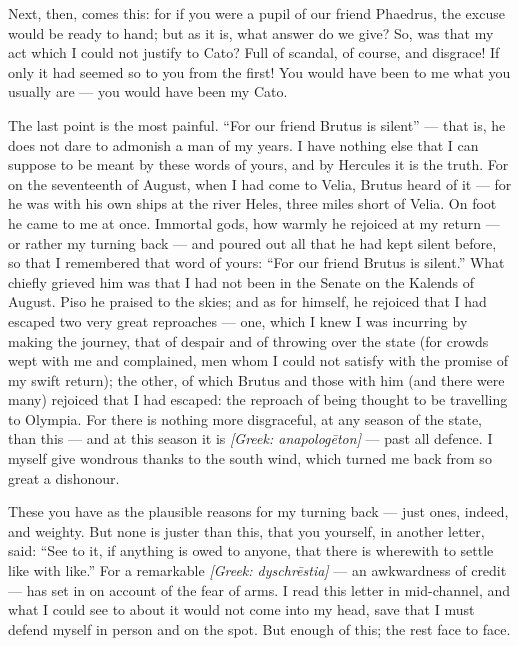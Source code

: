  Next, then, comes this: for if you were a pupil of our friend Phaedrus, the excuse would be ready to hand; but as it is, what answer do we give? So, was that my act which I could not justify to Cato? Full of scandal, of course, and disgrace! If only it had seemed so to you from the first! You would have been to me what you usually are --- you would have been my Cato.

 The last point is the most painful. ``For our friend Brutus is silent'' --- that is, he does not dare to admonish a man of my years. I have nothing else that I can suppose to be meant by these words of yours, and by Hercules it is the truth. For on the seventeenth of August, when I had come to Velia, Brutus heard of it --- for he was with his own ships at the river Heles, three miles short of Velia. On foot he came to me at once. Immortal gods, how warmly he rejoiced at my return --- or rather my turning back --- and poured out all that he had kept silent before, so that I remembered that word of yours: ``For our friend Brutus is silent.'' What chiefly grieved him was that I had not been in the Senate on the Kalends of August. Piso he praised to the skies; and as for himself, he rejoiced that I had escaped two very great reproaches --- one, which I knew I was incurring by making the journey, that of despair and of throwing over the state (for crowds wept with me and complained, men whom I could not satisfy with the promise of my swift return); the other, of which Brutus and those with him (and there were many) rejoiced that I had escaped: the reproach of being thought to be travelling to Olympia. For there is nothing more disgraceful, at any season of the state, than this --- and at this season it is \textit{[Greek: anapologēton]} --- past all defence. I myself give wondrous thanks to the south wind, which turned me back from so great a dishonour.

 These you have as the plausible reasons for my turning back --- just ones, indeed, and weighty. But none is juster than this, that you yourself, in another letter, said: ``See to it, if anything is owed to anyone, that there is wherewith to settle like with like.'' For a remarkable \textit{[Greek: dyschrēstia]} --- an awkwardness of credit --- has set in on account of the fear of arms. I read this letter in mid-channel, and what I could see to about it would not come into my head, save that I must defend myself in person and on the spot. But enough of this; the rest face to face.

